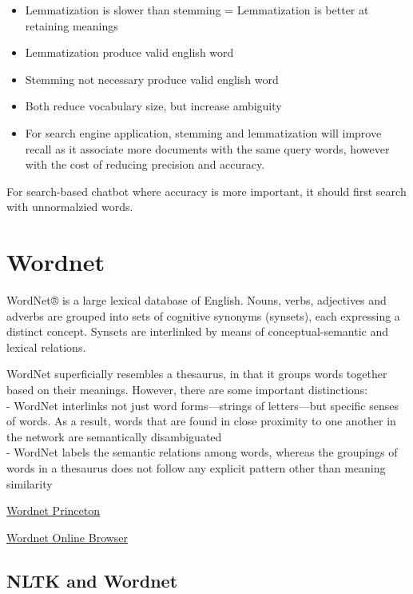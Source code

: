 \documentclass[
]{book}
\providecommand{\tightlist}{%
  \setlength{\itemsep}{0pt}\setlength{\parskip}{0pt}}
\begin{document}
\begin{itemize}
\tightlist
\item
  Lemmatization is slower than stemming = Lemmatization is better at retaining meanings
\item
  Lemmatization produce valid english word
\item
  Stemming not necessary produce valid english word
\item
  Both reduce vocabulary size, but increase ambiguity
\item
  For search engine application, stemming and lemmatization will improve recall as it associate more documents with the same query words, however with the cost of reducing precision and accuracy.
\end{itemize}

For search-based chatbot where accuracy is more important, it should first search with unnormalzied words.

\hypertarget{wordnet}{%
\section{Wordnet}\label{wordnet}}

WordNet® is a large lexical database of English. Nouns, verbs, adjectives and adverbs are grouped into sets of cognitive synonyms (synsets), each expressing a distinct concept. Synsets are interlinked by means of conceptual-semantic and lexical relations.

WordNet superficially resembles a thesaurus, in that it groups words together based on their meanings. However, there are some important distinctions:\\
- WordNet interlinks not just word forms---strings of letters---but specific senses of words. As a result, words that are found in close proximity to one another in the network are semantically disambiguated\\
- WordNet labels the semantic relations among words, whereas the groupings of words in a thesaurus does not follow any explicit pattern other than meaning similarity

\href{https://wordnet.princeton.edu}{Wordnet Princeton}

\href{http://wordnetweb.princeton.edu/perl/webwn}{Wordnet Online Browser}

\hypertarget{nltk-and-wordnet}{%
\subsection{NLTK and Wordnet}\label{nltk-and-wordnet}}
\end{document}
